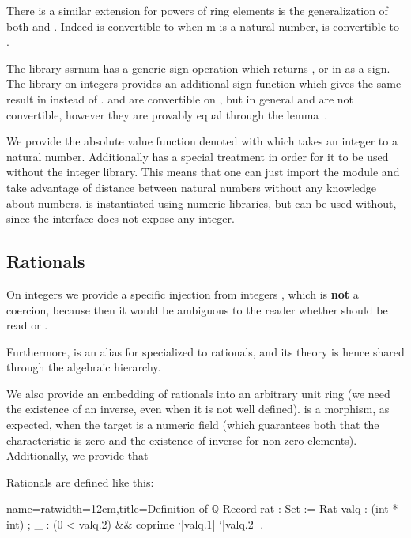 There is a similar extension for powers of ring elements \C{^} is the
generalization of both \C{^+} and \C{^-}. Indeed  is
convertible to  when m is a natural number, %
 is convertible to .


The library ssrnum has a generic sign operation  which
returns ,  or  in  as a sign. The library on
integers provides an additional sign function  which
gives the same result in  instead of .  and
 are convertible on , but in general  and
 are not convertible, however they are provably equal
through the lemma~.

We provide the absolute value function  denoted with 
which takes an integer to a natural number. Additionally 
has a special treatment in order for it to be used without the integer
library. This means that one can just import the module  and
take advantage of distance between natural numbers without any
knowledge about numbers.  is instantiated using numeric
libraries, but can be used without, since the interface does not
expose any integer.

\subsection{Rationals}
\label{sec:rationals-1}

On integers we provide a specific injection from integers ,
which is \textbf{not} a coercion, because then it would be ambiguous
to the reader whether  should be read  or
.

Furthermore,  is an alias for  specialized to
rationals, and its theory is hence shared through the algebraic
hierarchy.

We also provide an embedding  of rationals into an arbitrary
unit ring (we need the existence of an inverse, even when it is not
well defined).  is a morphism, as expected, when the target is a
numeric field (which guarantees both that the characteristic is zero
and the existence of inverse for non zero elements). Additionally, we
provide that

Rationals are defined like this:

\vspace{1em}

\begin{coq}{name=rat}{width=12cm,title=Definition of $\mathbb{Q}$}
Record rat : Set := Rat {
  valq : (int * int) ;
  _ : (0 < valq.2) && coprime `|valq.1| `|valq.2|
}.
\end{coq}

